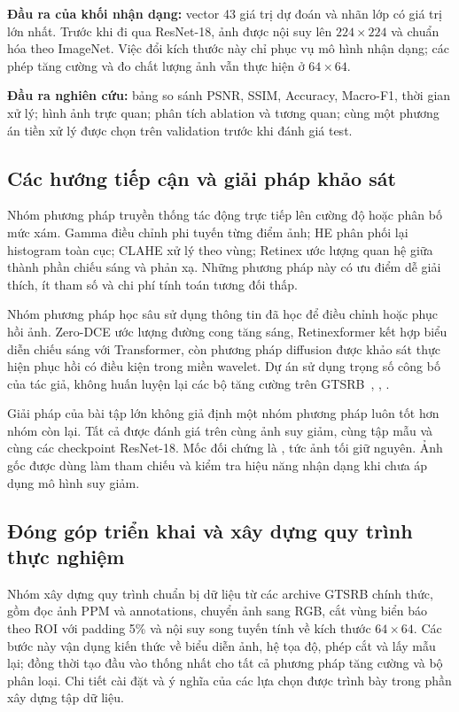 \textbf{Đầu ra của khối nhận dạng:} vector 43 giá trị dự đoán và nhãn lớp có giá trị lớn nhất. Trước khi đi qua ResNet-18, ảnh được nội suy lên $224\times224$ và chuẩn hóa theo ImageNet. Việc đổi kích thước này chỉ phục vụ mô hình nhận dạng; các phép tăng cường và đo chất lượng ảnh vẫn thực hiện ở $64\times64$.

\textbf{Đầu ra nghiên cứu:} bảng so sánh PSNR, SSIM, Accuracy, Macro-F1, thời gian xử lý; hình ảnh trực quan; phân tích ablation và tương quan; cùng một phương án tiền xử lý được chọn trên validation trước khi đánh giá test.

\subsection{Các hướng tiếp cận và giải pháp khảo sát}
Nhóm phương pháp truyền thống tác động trực tiếp lên cường độ hoặc phân bố mức xám. Gamma điều chỉnh phi tuyến từng điểm ảnh; HE phân phối lại histogram toàn cục; CLAHE xử lý theo vùng; Retinex ước lượng quan hệ giữa thành phần chiếu sáng và phản xạ. Những phương pháp này có ưu điểm dễ giải thích, ít tham số và chi phí tính toán tương đối thấp.

Nhóm phương pháp học sâu sử dụng thông tin đã học để điều chỉnh hoặc phục hồi ảnh. Zero-DCE ước lượng đường cong tăng sáng, Retinexformer kết hợp biểu diễn chiếu sáng với Transformer, còn phương pháp diffusion được khảo sát thực hiện phục hồi có điều kiện trong miền wavelet. Dự án sử dụng trọng số công bố của tác giả, không huấn luyện lại các bộ tăng cường trên GTSRB~\cite{zerodce}, \cite{retinexformer}, \cite{diffusion}.

Giải pháp của bài tập lớn không giả định một nhóm phương pháp luôn tốt hơn nhóm còn lại. Tất cả được đánh giá trên cùng ảnh suy giảm, cùng tập mẫu và cùng các checkpoint ResNet-18. Mốc đối chứng là , tức ảnh tối giữ nguyên. Ảnh gốc  được dùng làm tham chiếu và kiểm tra hiệu năng nhận dạng khi chưa áp dụng mô hình suy giảm.

\subsection{Đóng góp triển khai và xây dựng quy trình thực nghiệm}
\label{sec:contributions}
Nhóm xây dựng quy trình chuẩn bị dữ liệu từ các archive GTSRB chính thức, gồm đọc ảnh PPM và annotations, chuyển ảnh sang RGB, cắt vùng biển báo theo ROI với padding 5\% và nội suy song tuyến tính về kích thước $64\times64$. Các bước này vận dụng kiến thức về biểu diễn ảnh, hệ tọa độ, phép cắt và lấy mẫu lại; đồng thời tạo đầu vào thống nhất cho tất cả phương pháp tăng cường và bộ phân loại. Chi tiết cài đặt và ý nghĩa của các lựa chọn được trình bày trong phần xây dựng tập dữ liệu.

